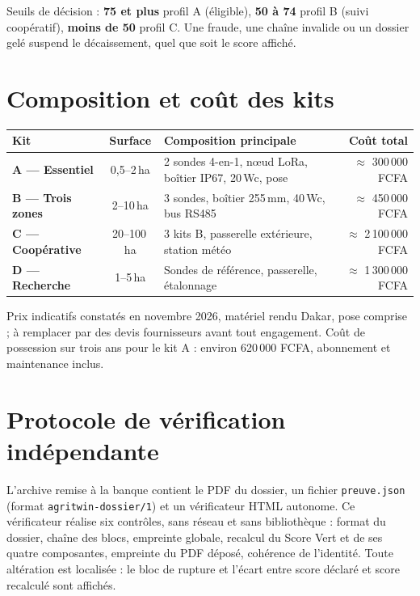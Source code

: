 \documentclass[12pt, a4paper]{article}
\begin{document}
Seuils de décision : \textbf{75 et plus} profil A (éligible), \textbf{50 à 74} profil B
(suivi coopératif), \textbf{moins de 50} profil C. Une fraude, une chaîne invalide ou un
dossier gelé suspend le décaissement, quel que soit le score affiché.

\section{Composition et coût des kits}

\begin{center}
\begin{tabularx}{\linewidth}{>{\bfseries\color{primary}}l c X r}
  \toprule
  \rowcolor{lightbg}
  Kit & Surface & Composition principale & Coût total \\
  \midrule
  A — Essentiel & 0,5–2\,ha & 2 sondes 4-en-1, nœud LoRa, boîtier IP67, 20\,Wc, pose & $\approx$ 300\,000 FCFA \\
  \addlinespace
  B — Trois zones & 2–10\,ha & 3 sondes, boîtier 255\,mm, 40\,Wc, bus RS485 & $\approx$ 450\,000 FCFA \\
  \addlinespace
  C — Coopérative & 20–100\,ha & 3 kits B, passerelle extérieure, station météo & $\approx$ 2\,100\,000 FCFA \\
  \addlinespace
  D — Recherche & 1–5\,ha & Sondes de référence, passerelle, étalonnage & $\approx$ 1\,300\,000 FCFA \\
  \bottomrule
\end{tabularx}
\end{center}

Prix indicatifs constatés en novembre 2026, matériel rendu Dakar, pose comprise ; à
remplacer par des devis fournisseurs avant tout engagement. Coût de possession sur trois
ans pour le kit A : environ 620\,000 FCFA, abonnement et maintenance inclus.

\section{Protocole de vérification indépendante}

L'archive remise à la banque contient le PDF du dossier, un fichier \texttt{preuve.json}
(format \texttt{agritwin-dossier/1}) et un vérificateur HTML autonome. Ce vérificateur
réalise six contrôles, sans réseau et sans bibliothèque : format du dossier, chaîne des
blocs, empreinte globale, recalcul du Score Vert et de ses quatre composantes, empreinte du
PDF déposé, cohérence de l'identité. Toute altération est localisée : le bloc de rupture et
l'écart entre score déclaré et score recalculé sont affichés.
\end{document}
